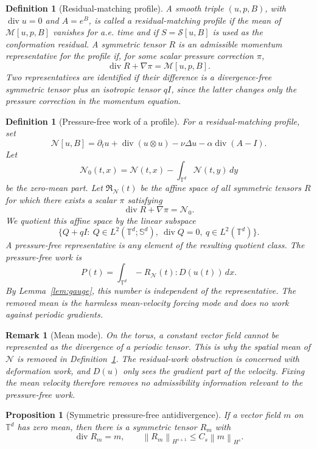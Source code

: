 \documentclass[11pt]{article}
\numberwithin{equation}{section}
\newtheorem{proposition}[theorem]{Proposition}
\newtheorem{definition}[theorem]{Definition}
\newtheorem{remark}[theorem]{Remark}
\newcommand{\T}{\mathbb T}
\newcommand{\Id}{I}
\newcommand{\Sym}{\mathbb S}
\newcommand{\divv}{\operatorname{div}}
\newcommand{\calM}{\mathcal M}
\newcommand{\calN}{\mathcal N}
\newcommand{\norm}[1]{\left\lVert #1\right\rVert}
\begin{document}
\begin{definition}[Residual-matching profile]
\label{def:residual-matching-profile}
A smooth triple \((u,p,B)\), with \(\divv u=0\) and \(A=e^B\), is called a
residual-matching profile if the mean of \(\calM[u,p,B]\) vanishes for a.e.
time and if \(S=\mathcal S[u,B]\) is used as the conformation residual.  A symmetric
tensor \(R\) is an admissible momentum representative for the profile if, for
some scalar pressure correction \(\pi\),
\[
  \divv R+\nabla\pi=\calM[u,p,B].
\]
Two representatives are identified if their difference is a divergence-free
symmetric tensor plus an isotropic tensor \(q\Id\), since the latter changes
only the pressure correction in the momentum equation.
\end{definition}

\begin{definition}[Pressure-free work of a profile]
\label{def:pressure-free-work}
For a residual-matching profile, set
\[
  \calN[u,B]=
  \partial_t u+\divv(u\otimes u)-\nu\Delta u-\alpha\divv(A-\Id).
\]
Let
\[
  \calN_0(t,x)=\calN(t,x)-\int_{\T^d}\calN(t,y)\,dy
\]
be the zero-mean part.  Let \(\mathfrak R_{\calN}(t)\) be the affine space of
all symmetric tensors \(R\) for which there exists a scalar \(\pi\) satisfying
\[
  \divv R+\nabla\pi=\calN_0 .
\]
We quotient this affine space by the linear subspace
\[
  \{Q+q\Id:\ Q\in L^2(\T^d;\Sym^d),\ \divv Q=0,\ q\in L^2(\T^d)\}.
\]
A pressure-free representative is any element of the resulting quotient class.
The pressure-free work is
\[
  P(t)=\int_{\T^d}-R_{\calN}(t):D(u(t))\,dx .
\]
By Lemma~\ref{lem:gauge}, this number is independent of the representative.
The removed mean is the harmless mean-velocity forcing mode and does no work
against periodic gradients.
\end{definition}

\begin{remark}[Mean mode]
On the torus, a constant vector field cannot be represented as the divergence
of a periodic tensor.  This is why the spatial mean of \(\calN\) is removed in
Definition~\ref{def:pressure-free-work}.  The residual-work obstruction is
concerned with deformation work, and \(D(u)\) only sees the gradient part of
the velocity.  Fixing the mean velocity therefore removes no admissibility
information relevant to the pressure-free work.
\end{remark}

\begin{proposition}[Symmetric pressure-free antidivergence]
\label{prop:antidiv}
If a vector field \(m\) on \(\T^d\) has zero mean, then there is a symmetric
tensor \(R_m\) with
\[
  \divv R_m=m,\qquad
  \norm{R_m}_{H^{s+1}}\le C_s\norm{m}_{H^s}.
\]
\end{proposition}
\end{document}
